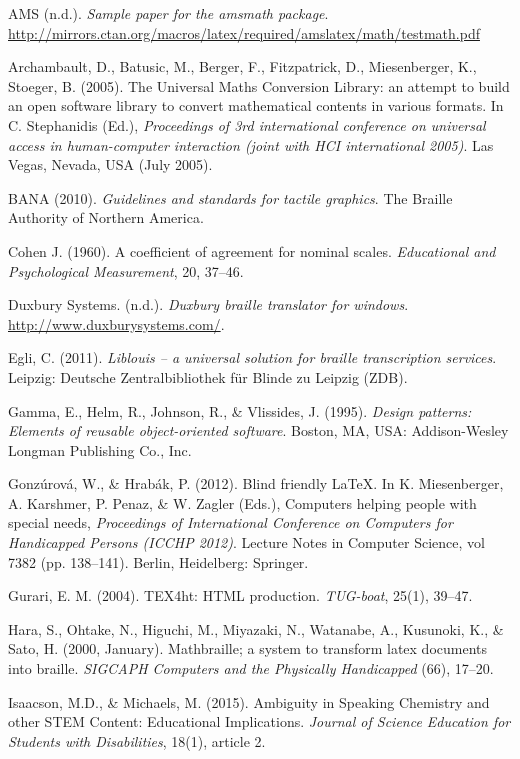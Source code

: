 \documentclass[11.5pt]{sig-alternate} %
\begin{document}
\leftskip 0.25in
\parindent -0.25in 

AMS (n.d.). \textit{Sample paper for the amsmath package}. \url{http://mirrors.ctan.org/macros/latex/required/amslatex/math/testmath.pdf}

Archambault, D., Batusic, M., Berger, F., Fitzpatrick, D., Miesenberger, K., Stoeger, B. (2005). The Universal Maths Conversion Library: an attempt to build an open software library to convert mathematical contents in various formats. In C. Stephanidis (Ed.), \textit{Proceedings of 3rd international conference on universal access in human-computer interaction (joint with HCI international 2005)}. Las Vegas, Nevada, USA (July 2005).

BANA (2010). \textit{Guidelines and standards for tactile graphics}. The Braille Authority of Northern America.

Cohen J. (1960). A coefficient of agreement for nominal scales. \textit{Educational and Psychological Measurement}, 20, 37–46.

Duxbury Systems. (n.d.). \textit{Duxbury braille translator for windows}. \url{http://www.duxburysystems.com/}.

Egli, C. (2011). \textit{Liblouis – a universal solution for braille transcription services}. Leipzig: Deutsche Zentralbibliothek für Blinde zu Leipzig (ZDB).

Gamma, E., Helm, R., Johnson, R., \& Vlissides, J. (1995). \textit{Design patterns: Elements of reusable object-oriented software}. Boston, MA, USA: Addison-Wesley Longman Publishing Co., Inc.

Gonzúrová, W., \& Hrabák, P. (2012). Blind friendly LaTeX. In K. Miesenberger, A. Karshmer, P. Penaz, \& W. Zagler (Eds.), Computers helping people with special needs, \textit{Proceedings of International Conference on Computers for Handicapped Persons (ICCHP 2012)}. Lecture Notes in Computer Science, vol 7382 (pp. 138–141). Berlin, Heidelberg: Springer.

Gurari, E. M. (2004). TEX4ht: HTML production. \textit{TUG-boat}, 25(1), 39–47.

Hara, S., Ohtake, N., Higuchi, M., Miyazaki, N., Watanabe, A., Kusunoki, K., \& Sato, H. (2000, January). Mathbraille; a system to transform latex documents into braille. \textit{SIGCAPH Computers and the Physically Handicapped} (66), 17–20.

Isaacson, M.D., \& Michaels, M. (2015). Ambiguity in Speaking Chemistry and other STEM Content: Educational Implications.  \textit{Journal of Science Education for Students with Disabilities}, 18(1), article 2. 
\end{document}
